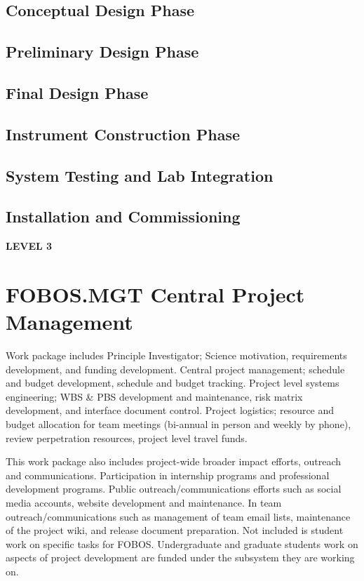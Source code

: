 \documentclass[oneside,11pt]{amsart}
\begin{document}
\subsection{Conceptual Design Phase}
\subsection{Preliminary Design Phase}
\subsection{Final Design Phase }
\subsection{Instrument Construction Phase}
\subsection{System Testing and Lab Integration}
\subsection{Installation and Commissioning}

\newpage

\begin{center}
{\bf \Large LEVEL 3}
\end{center}

\setcounter{section}{0}

\section{FOBOS.MGT Central Project Management}

Work package includes Principle Investigator; Science motivation,
requirements development, and funding development. Central project
management; schedule and budget development, schedule and budget
tracking. Project level systems engineering; WBS \& PBS development and
maintenance, risk matrix development, and interface document control.
Project logistics; resource and budget allocation for team meetings
(bi-annual in person and weekly by phone), review perpetration
resources, project level travel funds.

This work package also includes project-wide broader impact efforts,
outreach and communications. Participation in internship programs and
professional development programs. Public outreach/communications
efforts such as social media accounts, website development and
maintenance. In team outreach/communications such as management of
team email lists, maintenance of the project wiki, and release document
preparation. Not included is student work on specific tasks for
FOBOS. Undergraduate and graduate students work on aspects of project
development are funded under the subsystem they are working on.
\end{document}
